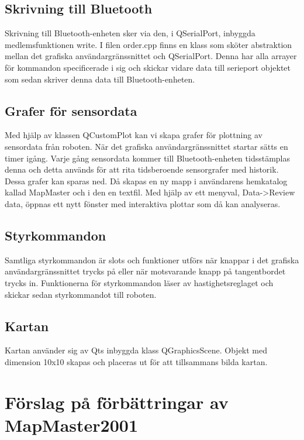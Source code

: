 \documentclass[a4paper,12pt,fleqn]{article}
\begin{document}
\subsection{Skrivning till Bluetooth}
Skrivning till Bluetooth-enheten sker via den, i QSerialPort, inbyggda medlemsfunktionen write. I filen order.cpp finns en klass som sköter abstraktion mellan det grafiska användargränssnittet och QSerialPort. Denna har alla arrayer för kommandon specificerade i sig och skickar vidare data till serieport objektet som sedan skriver denna data till Bluetooth-enheten. 

\subsection{Grafer för sensordata}
Med hjälp av klassen QCustomPlot kan vi skapa grafer för plottning av sensordata från roboten. När det grafiska användargränssnittet startar sätts en timer igång. Varje gång sensordata kommer till Bluetooth-enheten tidsstämplas denna och detta används för att rita tidsberoende sensorgrafer med historik. 
Dessa grafer kan sparas ned. Då skapas en ny mapp i användarens hemkatalog kallad MapMaster och i den en textfil. Med hjälp av ett menyval, Data->Review data, öppnas ett nytt fönster med interaktiva plottar som då kan analyseras.

\subsection{Styrkommandon}
Samtliga styrkommandon är slots och funktioner utförs när knappar i det grafiska användargränssnittet trycks på eller när motsvarande knapp på tangentbordet trycks in. 
Funktionerna för styrkommandon läser av hastighetsreglaget och skickar sedan styrkommandot till roboten. 
\subsection{Kartan}
Kartan använder sig av Qts inbyggda klass QGraphicsScene. Objekt med dimension 10x10 skapas och placeras ut för att tillsammans bilda kartan.


\newpage
\section{Förslag på förbättringar av MapMaster2001}
\end{document}
